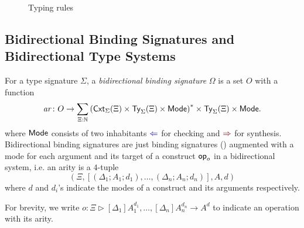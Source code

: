 \begin{figure}
  \centering
  \small
  \caption{Typing rules}
  \label{fig:extrinsic-typing}
\end{figure}

\subsection{Bidirectional Binding Signatures and Bidirectional Type Systems}

\begin{definition}
  For a type signature $\Sigma$, a \emph{bidirectional binding signature} $\Omega$ is a set $O$ with a function
  \[
    \mathit{ar}\colon O \to \sum_{\Xi : \mathbb{N}} \left(\mathsf{Cxt}_{\Sigma}(\Xi) \times \mathsf{Ty}_{\Sigma}(\Xi) \times {\mathsf{Mode}}\right)^* \times \mathsf{Ty}_{\Sigma}(\Xi) \times {\mathsf{Mode}}.
  \]
  where $\mathsf{Mode}$ consists of two inhabitants $\chk$ for checking and $\syn$ for synthesis.
  Bidirectional binding signatures are just binding signatures () augmented with a mode for each argument and its target of a construct $\mathsf{op}_o$ in a bidirectional system, i.e.
  an arity is a $4$-tuple
  \[
    \left(\Xi, \left[\left(\Delta_1; A_1; d_1\right), \ldots, \left(\Delta_{n}; A_{n}; d_n\right) \right], A, d\right)
  \]
  where $d$ and $d_i$'s indicate the modes of a construct and its arguments respectively.

  For brevity, we write $o \colon \Xi \rhd [\Delta_1]A_{1}^{d_1}, \ldots, [\Delta_{n}] A^{d_n}_{n} \to A^{d}$ to indicate an operation with its arity. 
\end{definition}

